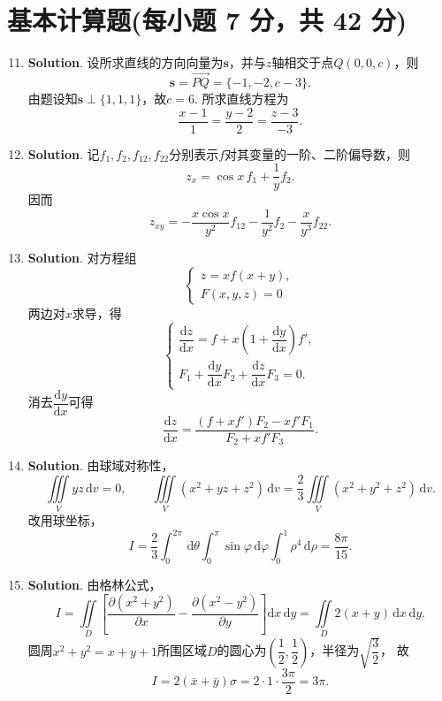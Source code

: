 \documentclass[../Main.tex]{subfiles}
\begin{document}
\section{基本计算题(每小题 7 分，共 42 分)}
\begin{enumerate}
  \setcounter{enumi}{10}
  \item \textbf{Solution}. 设所求直线的方向向量为$\boldsymbol{s}$，并与$z$轴相交于点$Q(0,0,c)$，则
        \[
          \boldsymbol{s}=\overrightarrow{PQ}=\{-1,-2,c-3\}.
        \]
        由题设知$\boldsymbol{s}\perp\{1,1,1\}$，故$c=6$.
        所求直线方程为
        \[
          \frac{x-1}{1}=\frac{y-2}{2}=\frac{z-3}{-3}.
        \]

  \item \textbf{Solution}. 记$f_{1},f_{2},f_{12},f_{22}$分别表示$f$对其变量的一阶、二阶偏导数，则
        \[
          z_{x}=\cos x\,f_{1}+\frac{1}{y}f_{2}.
        \]
        因而
        \[
          z_{xy}=-\frac{x\cos x}{y^{2}}f_{12}-\frac{1}{y^{2}}f_{2}-\frac{x}{y^{3}}f_{22}.
        \]

  \item \textbf{Solution}. 对方程组
        \[
          \begin{cases}
            z=xf(x+y), \\
            F(x,y,z)=0
          \end{cases}
        \]
        两边对$x$求导，得
        \[
          \begin{cases}
            \dfrac{\mathrm{d}z}{\mathrm{d}x}=f+x\left(1+\dfrac{\mathrm{d}y}{\mathrm{d}x}\right)f', \\[8pt]
            F_{1}+\dfrac{\mathrm{d}y}{\mathrm{d}x}F_{2}+\dfrac{\mathrm{d}z}{\mathrm{d}x}F_{3}=0.
          \end{cases}
        \]
        消去$\dfrac{\mathrm{d}y}{\mathrm{d}x}$可得
        \[
          \frac{\mathrm{d}z}{\mathrm{d}x}
          =\frac{(f+xf')F_{2}-xf'F_{1}}{F_{2}+xf'F_{3}}.
        \]

  \item \textbf{Solution}. 由球域对称性，
        \[
          \iiint\limits_{V}yz\,\mathrm{d}v=0,\qquad
          \iiint\limits_{V}(x^{2}+yz+z^{2})\,\mathrm{d}v
          =\frac{2}{3}\iiint\limits_{V}(x^{2}+y^{2}+z^{2})\,\mathrm{d}v.
        \]
        改用球坐标，
        \[
          I=\frac{2}{3}\int_{0}^{2\pi}\,\mathrm{d}\theta\int_{0}^{\pi}\sin\varphi\,\mathrm{d}\varphi\int_{0}^{1}\rho^{4}\,\mathrm{d}\rho
          =\frac{8\pi}{15}.
        \]

  \item \textbf{Solution}. 由格林公式，
        \[
          I=\iint\limits_{D}\left[\frac{\partial(x^{2}+y^{2})}{\partial x}-\frac{\partial(x^{2}-y^{2})}{\partial y}\right]\mathrm{d}x\,\mathrm{d}y
          =\iint\limits_{D}2(x+y)\,\mathrm{d}x\,\mathrm{d}y.
        \]
        圆周$x^{2}+y^{2}=x+y+1$所围区域$D$的圆心为$\left(\dfrac12,\dfrac12\right)$，半径为$\sqrt{\dfrac32}$，
        故
        \[
          I=2(\bar{x}+\bar{y})\sigma=2\cdot1\cdot\frac{3\pi}{2}=3\pi.
        \]


\end{enumerate}
\end{document}
